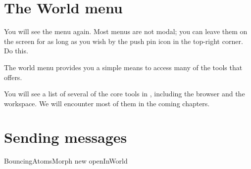 \documentclass[a4paper,10pt,twoside]{book}
\begin{document}
\section{The World menu}

You will see the  menu again.
Most \pharo menus are not modal; you can leave them on the screen for as long as you wish by  the push pin icon in the top-right corner. Do this.

The world menu provides you a simple means to access many of the tools that \pharo offers.


You will see a list of several of the core tools in \pharo, including the browser and the workspace.
We will encounter most of them in the coming chapters.

\section{Sending messages}


\begin{code}{}
BouncingAtomsMorph new openInWorld
\end{code}

\end{document}
